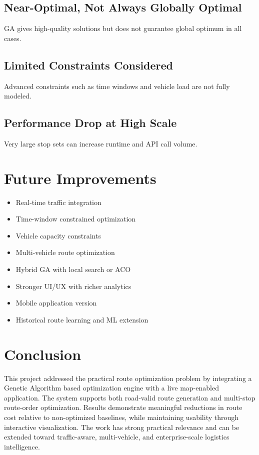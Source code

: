 \documentclass[12pt,a4paper]{report}
\begin{document}
\section{Near-Optimal, Not Always Globally Optimal}
GA gives high-quality solutions but does not guarantee global optimum in all cases.

\section{Limited Constraints Considered}
Advanced constraints such as time windows and vehicle load are not fully modeled.

\section{Performance Drop at High Scale}
Very large stop sets can increase runtime and API call volume.

\chapter{Future Improvements}

\begin{itemize}
    \item Real-time traffic integration
    \item Time-window constrained optimization
    \item Vehicle capacity constraints
    \item Multi-vehicle route optimization
    \item Hybrid GA with local search or ACO
    \item Stronger UI/UX with richer analytics
    \item Mobile application version
    \item Historical route learning and ML extension
\end{itemize}

\chapter{Conclusion}
This project addressed the practical route optimization problem by integrating a Genetic Algorithm based optimization engine with a live map-enabled application. The system supports both road-valid route generation and multi-stop route-order optimization. Results demonstrate meaningful reductions in route cost relative to non-optimized baselines, while maintaining usability through interactive visualization. The work has strong practical relevance and can be extended toward traffic-aware, multi-vehicle, and enterprise-scale logistics intelligence.
\end{document}
